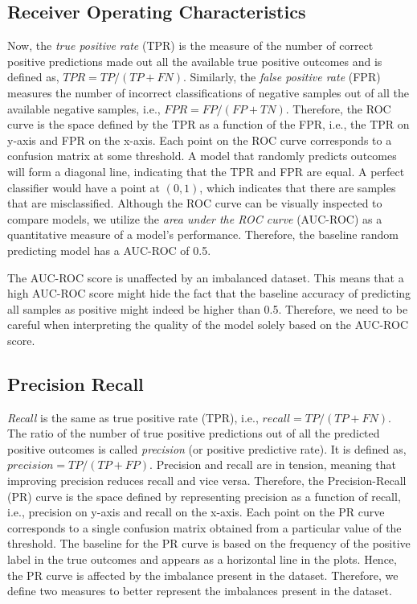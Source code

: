 \subsection{Receiver Operating Characteristics}
Now, the \textit{true positive rate} (TPR) is the measure of the number of correct positive predictions made out all the available true positive outcomes and is defined as, $TPR = TP/(TP+FN)$.
Similarly, the \textit{false positive rate} (FPR) measures the number of incorrect classifications of negative samples out of all the available negative samples, i.e., $FPR = FP/(FP+TN)$.
Therefore, the ROC curve is the space defined by the TPR as a function of the FPR, i.e., the TPR on y-axis and FPR on the x-axis. 
Each point on the ROC curve corresponds to a confusion matrix at some threshold.
A model that randomly predicts outcomes will form a diagonal line, indicating that the TPR and FPR are equal.
A perfect classifier would have a point at $(0,1)$, which indicates that there are samples that are misclassified.
Although the ROC curve can be visually inspected to compare models, we utilize the \textit{area under the ROC curve} (AUC-ROC) as a quantitative measure of a model's performance.
Therefore, the baseline random predicting model has a AUC-ROC of 0.5.

The AUC-ROC score is unaffected by an imbalanced dataset. 
This means that a high AUC-ROC score might hide the fact that the baseline accuracy of predicting all samples as positive might indeed be higher than 0.5.
Therefore, we need to be careful when interpreting the quality of the model solely based on the AUC-ROC score.

\subsection{Precision Recall}
\textit{Recall} is the same as true positive rate (TPR), i.e., $recall = TP/(TP+FN)$.
The ratio of the number of true positive predictions out of all the predicted positive outcomes is called \textit{precision} (or positive predictive rate).
It is defined as, $precision = TP/(TP+FP)$. 
Precision and recall are in tension, meaning that improving precision reduces recall and vice versa.
Therefore, the Precision-Recall (PR) curve is the space defined by representing precision as a function of recall, i.e., precision on y-axis and recall on the x-axis.
Each point on the PR curve corresponds to a single confusion matrix obtained from a particular value of the threshold.
The baseline for the PR curve is based on the frequency of the positive label in the true outcomes and appears as a horizontal line in the plots.
Hence, the PR curve is affected by the imbalance present in the dataset.
Therefore, we define two measures to better represent the imbalances present in the \wikirfa dataset.

